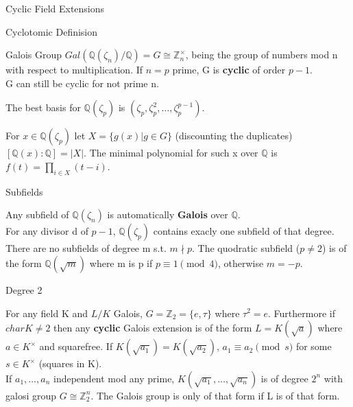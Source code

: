 \documentclass[12pt, letterpaper]{article}
\newcommand{\Q}{\mathbb{Q}}
\newcommand{\Z}{\mathbb{Z}}
\begin{document}
\begin{section}{Cyclic Field Extensions}
\begin{subsection}{Cyclotomic Definision}
\begin{subsubsection}{Galois Group}
      \(Gal(\Q(\zeta_{n}) / \Q) = G \cong \Z^{\times}_{n}\), being the group of
      numbers mod n with respect to multiplication. If \(n = p\) prime, G is
      \textbf{cyclic} of order \(p - 1\). \\
      G can still be cyclic for not prime n.

      The best basis for \(\Q(\zeta_{p})\) is
      \((\zeta_{p}, \zeta^{2}_{p}, \dots , \zeta^{p - 1}_{p})\).

      For \(x \in \Q(\zeta_{p})\) let \(X = \{g(x) | g \in G\}\)
      (discounting the duplicates) \([\Q(x) : \Q] = | X | \). The minimal
      polynomial for such x over \(\Q\) is \(f(t) = \prod_{i \in X} (t - i)\).

    \end{subsubsection}

    \begin{subsubsection}{Subfields}

      Any subfield of \(\Q(\zeta_{n})\) is automatically \textbf{Galois} over
      \(\Q\). \\
      For any divisor d of \(p - 1\), \(\Q(\zeta_{p})\) contains exacly one
      subfield of that degree. There are no subfields of degree m s.t.
      \(m \nmid p\). The quodratic subfield (\(p \neq 2\)) is of the form
      \(\Q(\sqrt{m})\) where m is p if \(p \equiv 1 \pmod{4}\), otherwise
      \(m = -p\). \\

    \end{subsubsection}

  \end{subsection}

  \begin{subsection}{Degree 2}

    For any field K and \(L / K\) Galois, \(G = \Z_{2} = \{e, \tau\}\) where
    \(\tau^{2} = e\). Furthermore if \(char K \neq 2\) then any \textbf{cyclic}
    Galois extension is of the form \(L = K(\sqrt{a})\) where
    \(a \in K^{\times}\) and squarefree. If \(K(\sqrt{a_{1}}) =
    K(\sqrt{a_{2}})\), \(a_{1} \equiv a_{2} \pmod{s}\) for some
    \(s \in K^{\times}\) (squares in K). \\
    If \(a_{1}, \dots , a_{n}\) independent mod any prime, \(K(\sqrt{a_{1}},
    \dots , \sqrt{a_{n}})\) is of degree \(2^{n}\) with galosi group
    \(G \cong \Z^{n}_{2}\). The Galois group is only of that form if L is of
    that form.

  \end{subsection}


\end{section}
\end{document}
